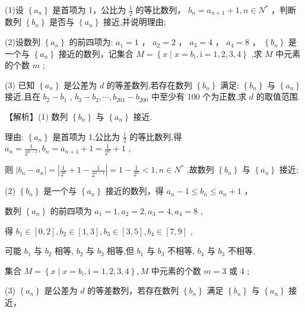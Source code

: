 \documentclass[10pt]{article}
\begin{document}
(1)设 \(\left\{  {a}_{n}\right\}\) 是首项为 1，公比为 \(\frac{1}{2}\) 的等比数列， \({b}_{n} = {a}_{n + 1} + 1,n \in  {N}^{ * }\) ，判断数列 \(\left\{  {b}_{n}\right\}\) 是否与 \(\left\{  {a}_{n}\right\}\) 接近,并说明理由;

(2)设数列 \(\left\{  {a}_{n}\right\}\) 的前四项为: \({a}_{1} = 1\) ， \({a}_{2} = 2\) ， \({a}_{3} = 4\) ， \({a}_{4} = 8\) ， \(\left\{  {b}_{n}\right\}\) 是一个与 \(\left\{  {a}_{n}\right\}\) 接近的数列，记集合 \(M = \left\{  {x \mid  x = {b}_{i},\mathrm{i} = 1,2,3,4}\right\}\) ,求 \(M\) 中元素的个数 \(m\) ;

(3) 已知 \(\left\{  {a}_{n}\right\}\) 是公差为 \(d\) 的等差数列,若存在数列 \(\left\{  {b}_{n}\right\}\) 满足: \(\left\{  {b}_{n}\right\}\) 与 \(\left\{  {a}_{n}\right\}\) 接近,且在 \({b}_{2} - {b}_{1}\) , \({b}_{3} - {b}_{2},\cdots ,{b}_{201} - {b}_{200}\) 中至少有 100 个为正数,求 \(d\) 的取值范围.

【解析】(1) 数列 \(\left\{  {b}_{n}\right\}\) 与 \(\left\{  {a}_{n}\right\}\) 接近.

理由: \(\left\{  {a}_{n}\right\}\) 是首项为 1,公比为 \(\frac{1}{2}\) 的等比数列,得 \({a}_{n} = \frac{1}{{2}^{n - 1}},{b}_{n} = {a}_{n + 1} + 1 = \frac{1}{{2}^{n}} + 1\) ,

则 \(\left| {{b}_{n} - {a}_{n}}\right|  = \left| {\frac{1}{{2}^{n}} + 1 - \frac{1}{{2}^{n - 1}}}\right|  = 1 - \frac{1}{{2}^{n}} < 1,n \in  {N}^{ * }\) ,故数列 \(\left\{  {b}_{n}\right\}\) 与 \(\left\{  {a}_{n}\right\}\) 接近;

(2) \(\left\{  {b}_{n}\right\}\) 是一个与 \(\left\{  {a}_{n}\right\}\) 接近的数列，得 \({a}_{n} - 1 \leq  {b}_{n} \leq  {a}_{n} + 1\) ，

数列 \(\left\{  {a}_{n}\right\}\) 的前四项为 \({a}_{1} = 1,{a}_{2} = 2,{a}_{3} = 4,{a}_{4} = 8\) ,

得 \({b}_{1} \in  \left\lbrack  {0,2}\right\rbrack  ,{b}_{2} \in  \left\lbrack  {1,3}\right\rbrack  ,{b}_{3} \in  \left\lbrack  {3,5}\right\rbrack  ,{b}_{4} \in  \left\lbrack  {7,9}\right\rbrack\) ,

可能 \({b}_{1}\) 与 \({b}_{2}\) 相等, \({b}_{2}\) 与 \({b}_{3}\) 相等,但 \({b}_{1}\) 与 \({b}_{3}\) 不相等, \({b}_{4}\) 与 \({b}_{3}\) 不相等,

集合 \(M = \left\{  {x \mid  x = {b}_{i},\mathrm{i} = 1,2,3,4}\right\}  ,M\) 中元素的个数 \(m = 3\) 或 4 ;

(3) \(\left\{  {a}_{n}\right\}\) 是公差为 \(d\) 的等差数列，若存在数列 \(\left\{  {b}_{n}\right\}\) 满足 \(\left\{  {b}_{n}\right\}\) 与 \(\left\{  {a}_{n}\right\}\) 接近，
\end{document}
